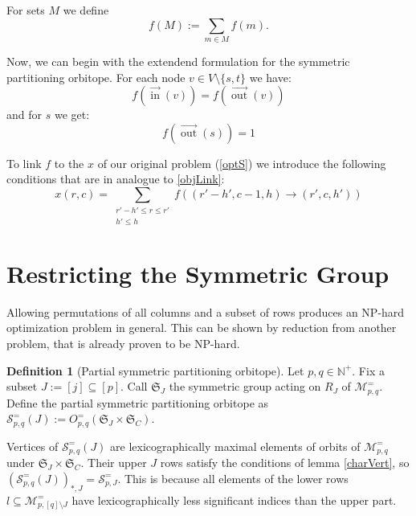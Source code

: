 \documentclass[a4paper]{amsart}
\theoremstyle{lemma}
\theoremstyle{definition}
\newtheorem{defn}[theorem]{Definition}
\theoremstyle{remark}
\theoremstyle{example}
\DeclareMathOperator{\In}{in}
\DeclareMathOperator{\Out}{out}
\newcommand{\ina}{\ensuremath{\vec{\In}}}
\newcommand{\outa}{\ensuremath{\vec{\Out}}}
\newcommand{\lr}[1]{\ensuremath{\left( #1 \right)}}
\newcommand{\lrE}[1]{\ensuremath{\left[ #1 \right]}}
\newcommand{\naturals}{\ensuremath{\mathbb{N}}}
\newcommand{\M}{\ensuremath{\mathcal{M}}}
\newcommand{\calS}{\ensuremath{\mathcal{S}}}
\newcommand{\Sym}{\ensuremath{\mathfrak{S}}}
\begin{document}
For sets \(M\) we define
\[f (M) := \sum_{m\in M} f(m)\text{.}\]

Now, we can begin with the extendend formulation for the 
symmetric partitioning orbitope.  For each node \(v \in V \setminus
\{s, t\}\) we have:
\begin{equation}
f\lr{\ina(v)} = f\lr{\outa(v)}
\end{equation}
and for \(s\) we get:
\begin{equation}
f\lr{\outa(s)} = 1
\end{equation}



To link \(f\) to the \(x\) of our original problem (\ref{optS}) we
introduce the following conditions that are in analogue to \ref{objLink}:
\begin{equation}
  x \lr{ r, c } =
  \sum_{\begin{matrix}r' - h' \leq r \leq r'\\ h' \leq h\end{matrix}} f\lr{\lr{r'-h', c-1, h}
    \rightarrow \lr{r', c, h'} }
\end{equation}

\section{Restricting the Symmetric Group}

Allowing permutations of all columns and a subset of rows produces an
NP-hard optimization problem in general.  This can be shown by
reduction from another problem, that is already proven to be NP-hard.

\begin{defn}[Partial symmetric partitioning orbitope]
  \label{def-subset-rows}
  Let \(p, q \in \naturals^+\).  Fix a subset \(J := \lrE{j} \subseteq \lrE{p}\).
  Call \(\Sym_{J}\) the symmetric group acting on \(R_J\) of
  \(\M^=_{p, q}\).  Define the partial symmetric partitioning orbitope
  as \(\mathcal{S}^=_{p,q}\lr{J} := O^=_{p, q} \lr{\Sym_{J} \times
    \Sym_{C}} \).
\end{defn}

Vertices of \(\calS^=_{p,q}\lr{J}\) are lexicographically maximal
elements of orbits of \(\M^=_{p,q}\) under \(\Sym_{J} \times
\Sym_{C}\).  Their upper \(J\) rows satisfy the conditions of lemma
\ref{charVert}, so \(\lr{\calS^=_{p,q} \lr{J} }_{*,J} =
\calS^=_{p,J}\).  This is because all elements of the lower rows \(l
\subseteq \M^=_{p, \lrE{q}\setminus J}\) have lexicographically less
significant indices than the upper part.
\end{document}
